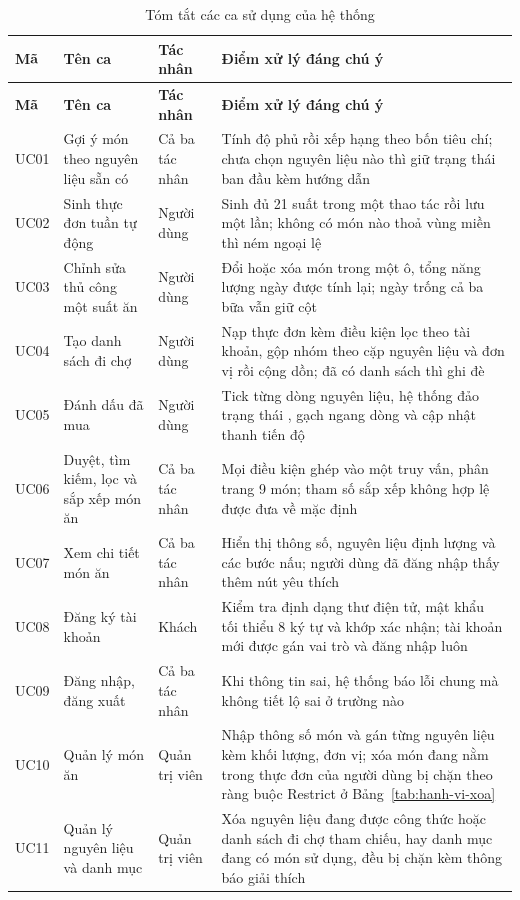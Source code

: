 \begin{longtable}{|P{1.2cm}|P{3.3cm}|P{2.4cm}|P{6.2cm}|}
\caption{Tóm tắt các ca sử dụng của hệ thống}
\label{tab:uc-tom-tat}\\
\hline
\bfseries Mã & \bfseries Tên ca & \bfseries Tác nhân & \bfseries Điểm xử lý
  đáng chú ý \\ \hline
\endfirsthead
\hline
\bfseries Mã & \bfseries Tên ca & \bfseries Tác nhân & \bfseries Điểm xử lý
  đáng chú ý \\ \hline
\endhead
\endfoot
UC01 & Gợi ý món theo nguyên liệu sẵn có & Cả ba tác nhân & Tính độ phủ rồi xếp
  hạng theo bốn tiêu chí; chưa chọn nguyên liệu nào thì giữ trạng thái ban đầu
  kèm hướng dẫn \\ \hline
UC02 & Sinh thực đơn tuần tự động & Người dùng & Sinh đủ 21 suất trong một thao
  tác rồi lưu một lần; không có món nào thoả vùng miền thì ném ngoại lệ \\ \hline
UC03 & Chỉnh sửa thủ công một suất ăn & Người dùng & Đổi hoặc xóa món trong một
  ô, tổng năng lượng ngày được tính lại; ngày trống cả ba bữa vẫn giữ cột \\ \hline
UC04 & Tạo danh sách đi chợ & Người dùng & Nạp thực đơn kèm điều kiện lọc theo
  tài khoản, gộp nhóm theo cặp nguyên liệu và đơn vị rồi cộng dồn; đã có danh
  sách thì ghi đè \\ \hline
UC05 & Đánh dấu đã mua & Người dùng & Tick từng dòng nguyên liệu, hệ thống đảo
  trạng thái , gạch ngang dòng và cập nhật thanh tiến
  độ \\ \hline
UC06 & Duyệt, tìm kiếm, lọc và sắp xếp món ăn & Cả ba tác nhân & Mọi điều kiện
  ghép vào một truy vấn, phân trang 9 món; tham số sắp xếp không hợp lệ được đưa
  về mặc định \\ \hline
UC07 & Xem chi tiết món ăn & Cả ba tác nhân & Hiển thị thông số, nguyên liệu
  định lượng và các bước nấu; người dùng đã đăng nhập thấy thêm nút yêu
  thích \\ \hline
UC08 & Đăng ký tài khoản & Khách & Kiểm tra định dạng thư điện tử, mật khẩu tối
  thiểu 8 ký tự và khớp xác nhận; tài khoản mới được gán vai trò  và
  đăng nhập luôn \\ \hline
UC09 & Đăng nhập, đăng xuất & Cả ba tác nhân & Khi thông tin sai, hệ thống báo
  lỗi chung mà không tiết lộ sai ở trường nào \\ \hline
UC10 & Quản lý món ăn & Quản trị viên & Nhập thông số món và gán từng nguyên
  liệu kèm khối lượng, đơn vị; xóa món đang nằm trong thực đơn của người dùng bị
  chặn theo ràng buộc Restrict ở Bảng~\ref{tab:hanh-vi-xoa} \\ \hline
UC11 & Quản lý nguyên liệu và danh mục & Quản trị viên & Xóa nguyên liệu đang
  được công thức hoặc danh sách đi chợ tham chiếu, hay danh mục đang có món sử
  dụng, đều bị chặn kèm thông báo giải thích \\ \hline
\end{longtable}

